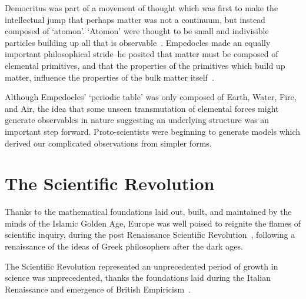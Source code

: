 Democritus was part of a movement of thought which was first to make the
intellectual jump that perhaps matter was not a continuum, but instead composed
of `atomon'. `Atomon' were thought to be small and indivisible particles
building up all that is observable~\cite{Baldes1978}.  Empedocles made an
equally important philosophical stride--he posited that matter must be composed
of elemental primitives, and that the properties of the primitives which build
up matter, influence the properties of the bulk matter itself~\cite{Long1949}.

Although Empedocles' `periodic table' was only composed of Earth, Water, Fire,
and Air, the idea that some unseen transmutation of elemental forces might
generate observables in nature suggesting an underlying structure was an
important step forward.  Proto-scientists were beginning to generate models
which derived our complicated observations from simpler forms.

\clearpage
\section{The Scientific Revolution}

Thanks to the mathematical foundations laid out, built, and maintained by the
minds of the Islamic Golden Age, Europe was well poised to reignite the flames
of scientific inquiry, during the post Renaissance Scientific
Revolution~\cite{Alexakos2005}, following a renaissance of the ideas of Greek
philosophers after the dark ages.

The Scientific Revolution represented an unprecedented period of growth in
science was unprecedented, thanks the foundations laid during the Italian
Renaissance and emergence of British Empiricism~\cite{Cowley1968}.

